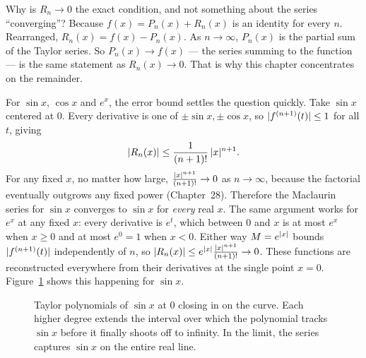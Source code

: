 \begin{whybox}
Why is $R_n \to 0$ the exact condition, and not something about the series
``converging''? Because $f(x) = P_n(x) + R_n(x)$ is an identity for every $n$.
Rearranged, $R_n(x) = f(x) - P_n(x)$. As $n \to \infty$, $P_n(x)$ is the partial sum
of the Taylor series. So $P_n(x) \to f(x)$ --- the series summing to the function ---
is the same statement as $R_n(x) \to 0$. That is why this chapter concentrates on
the remainder.
\end{whybox}

For $\sin x$, $\cos x$ and $e^x$, the error bound settles the question quickly. Take
$\sin x$ centered at $0$. Every derivative is one of $\pm\sin x, \pm\cos x$, so
$\lvert f^{(n+1)}(t)\rvert \le 1$ for all $t$, giving
\[
  \lvert R_n(x)\rvert \le \frac{1}{(n+1)!}\,\lvert x\rvert^{n+1}.
\]
For any fixed $x$, no matter how large, $\frac{\lvert x\rvert^{n+1}}{(n+1)!} \to 0$ as
$n\to\infty$, because the factorial eventually outgrows any fixed power (Chapter~28).
Therefore the Maclaurin
series for $\sin x$ converges to $\sin x$ for \emph{every} real $x$. The same
argument works for $e^x$ at any fixed $x$: every derivative is $e^t$, which between
$0$ and $x$ is at most $e^x$ when $x\ge 0$ and at most $e^0 = 1$ when $x<0$. Either
way $M = e^{\lvert x\rvert}$ bounds $\lvert f^{(n+1)}(t)\rvert$ independently of $n$, so
$\lvert R_n(x)\rvert \le e^{\lvert x\rvert}\frac{\lvert x\rvert^{n+1}}{(n+1)!} \to 0$. These functions are
reconstructed everywhere from their derivatives at the single point $x=0$.
Figure~\ref{ch31:fig-sin-taylor} shows this happening for $\sin x$.

\begin{figure}[H]
\centering
{}
\caption{Taylor polynomials of $\sin x$ at $0$ closing in on the curve. Each higher
degree extends the interval over which the polynomial tracks $\sin x$ before it finally
shoots off to infinity. In the limit, the series captures $\sin x$ on the entire real
line.}
\label{ch31:fig-sin-taylor}
\end{figure}

